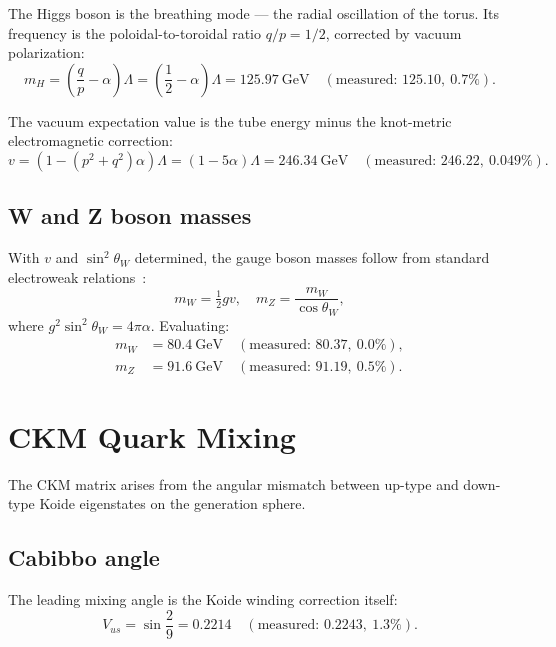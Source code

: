\documentclass[11pt,a4paper]{article}
\begin{document}
The Higgs boson is the breathing mode --- the radial oscillation of the torus. Its frequency is the poloidal-to-toroidal ratio $q/p = 1/2$, corrected by vacuum polarization:
\begin{equation}
  m_H = \left(\frac{q}{p} - \alpha\right)\Lambda = \left(\frac{1}{2} - \alpha\right)\Lambda = 125.97~\text{GeV} \quad (\text{measured: } 125.10,\ 0.7\%).
  \label{eq:higgs}
\end{equation}

The vacuum expectation value is the tube energy minus the knot-metric electromagnetic correction:
\begin{equation}
  v = (1 - (p^2+q^2)\alpha)\Lambda = (1 - 5\alpha)\Lambda = 246.34~\text{GeV} \quad (\text{measured: } 246.22,\ 0.049\%).
  \label{eq:vev}
\end{equation}

\subsection{W and Z boson masses}

With $v$ and $\sin^2\theta_W$ determined, the gauge boson masses follow from standard electroweak relations~\cite{weinberg1967}:
\begin{equation}
  m_W = \tfrac{1}{2}gv, \quad m_Z = \frac{m_W}{\cos\theta_W},
  \label{eq:gauge-boson-relations}
\end{equation}
where $g^2 \sin^2\theta_W = 4\pi\alpha$. Evaluating:
\begin{align}
  m_W &= 80.4~\text{GeV} \quad (\text{measured: } 80.37,\ 0.0\%), \label{eq:mW} \\
  m_Z &= 91.6~\text{GeV} \quad (\text{measured: } 91.19,\ 0.5\%). \label{eq:mZ}
\end{align}

\section{CKM Quark Mixing}
\label{sec:ckm}

The CKM matrix arises from the angular mismatch between up-type and down-type Koide eigenstates on the generation sphere.

\subsection{Cabibbo angle}

The leading mixing angle is the Koide winding correction itself:
\begin{equation}
  V_{us} = \sin\frac{2}{9} = 0.2214 \quad (\text{measured: } 0.2243,\ 1.3\%).
  \label{eq:cabibbo}
\end{equation}
\end{document}
